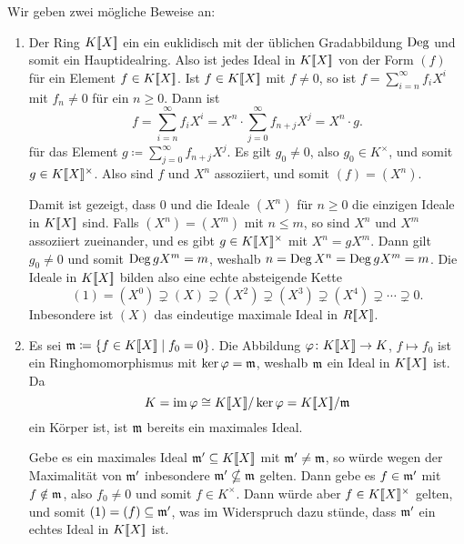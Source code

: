 \begin{solution}
  Wir geben zwei mögliche Beweise an:
  \begin{enumerate}
    \item
      Der Ring $K[\![X]\!]$ ein ein euklidisch mit der üblichen Gradabbildung $\operatorname{Deg}$ und somit ein Hauptidealring.
      Also ist jedes Ideal in $K[\![X]\!]$ von der Form $(f)$ für ein Element $f \in K[\![X]\!]$.
      Ist $f \in K[\![X]\!]$ mit $f \neq 0$, so ist $f = \sum_{i=n}^\infty f_i X^i$ mit $f_n \neq 0$ für ein $n \geq 0$.
      Dann ist
      \[
          f
        = \sum_{i=n}^\infty f_i X^i
        = X^n \cdot \sum_{j=0}^\infty f_{n+j} X^j
        = X^n \cdot g.
      \]
      für das Element $g \coloneqq \sum_{j=0}^\infty f_{n+j} X^j$.
      Es gilt $g_0 \neq 0$, also $g_0 \in K^\times$, und somit $g \in K[\![X]\!]^\times$.
      Also sind $f$ und $X^n$ assoziiert, und somit $(f) = (X^n)$.
      
      Damit ist gezeigt, dass $0$ und die Ideale $(X^n)$ für $n \geq 0$ die einzigen Ideale in $K[\![X]\!]$ sind.
      Falls $(X^n) = (X^m)$ mit $n \leq m$, so sind $X^n$ und $X^m$ assoziiert zueinander, und es gibt $g \in K[\![X]\!]^\times$ mit $X^n = g X^m$.
      Dann gilt $g_0 \neq 0$ und somit $\operatorname{Deg} g X^m = m$, weshalb $n = \operatorname{Deg} X^n = \operatorname{Deg} g X^m = m$.
      Die Ideale in $K[\![X]\!]$ bilden also eine echte absteigende Kette
      \[
                    (1)
        =           (X^0)
        \supsetneq  (X)
        \supsetneq  (X^2)
        \supsetneq  (X^3)
        \supsetneq  (X^4)
        \supsetneq \dotsb
        \supsetneq  0.
      \]
      Inbesondere ist $(X)$ das eindeutige maximale Ideal in $R[\![X]\!]$.
    \item
      Es sei $\mathfrak{m} \coloneqq \{f \in K[\![X]\!] \mid f_0 = 0\}$.
      Die Abbildung $\varphi \colon K[\![X]\!] \to K$, $f \mapsto f_0$ ist ein Ringhomomorphismus mit $\ker \varphi = \mathfrak{m}$, weshalb $\mathfrak{m}$ ein Ideal in $K[\![X]\!]$ ist.
      Da
      \[
              K
        =     \operatorname{im} \varphi
        \cong K[\![X]\!]/\ker \varphi
        =     K[\![X]\!]/\mathfrak{m}
      \]
      ein Körper ist, ist $\mathfrak{m}$ bereits ein maximales Ideal.

      Gebe es ein maximales Ideal $\mathfrak{m}' \subseteq K[\![X]\!]$ mit $\mathfrak{m}' \neq \mathfrak{m}$, so würde wegen der Maximalität von $\mathfrak{m}'$ inbesondere $\mathfrak{m}' \nsubseteq \mathfrak{m}$ gelten.
      Dann gebe es $f \in \mathfrak{m}'$ mit $f \notin \mathfrak{m}$, also $f_0 \neq 0$ und somit $f \in K^\times$.
      Dann würde aber $f \in K[\![X]\!]^\times$ gelten, und somit $(1) = (f) \subseteq \mathfrak{m}'$, was im Widerspruch dazu stünde, dass $\mathfrak{m}'$ ein echtes Ideal in $K[\![X]\!]$ ist.
  \end{enumerate}
\end{solution}
